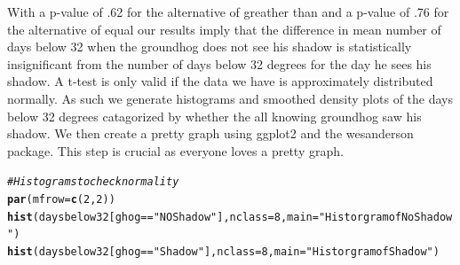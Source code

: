 \documentclass[12pt]{article}\usepackage[]{graphicx}\usepackage[]{color}
\makeatletter
\newcommand{\hlnum}[1]{\textcolor[rgb]{0.686,0.059,0.569}{#1}}%
\newcommand{\hlstr}[1]{\textcolor[rgb]{0.192,0.494,0.8}{#1}}%
\newcommand{\hlcom}[1]{\textcolor[rgb]{0.678,0.584,0.686}{\textit{#1}}}%
\newcommand{\hlopt}[1]{\textcolor[rgb]{0,0,0}{#1}}%
\newcommand{\hlstd}[1]{\textcolor[rgb]{0.345,0.345,0.345}{#1}}%
\newcommand{\hlkwc}[1]{\textcolor[rgb]{0.333,0.667,0.333}{#1}}%
\newcommand{\hlkwd}[1]{\textcolor[rgb]{0.737,0.353,0.396}{\textbf{#1}}}%
\newenvironment{kframe}{%
 \def\at@end@of@kframe{}%
 \ifinner\ifhmode%
  \def\at@end@of@kframe{\end{minipage}}%
  \begin{minipage}{\columnwidth}%
 \fi\fi%
 \def\FrameCommand##1{\hskip\@totalleftmargin \hskip-\fboxsep
 \colorbox{shadecolor}{##1}\hskip-\fboxsep
     \hskip-\linewidth \hskip-\@totalleftmargin \hskip\columnwidth}%
 \MakeFramed {\advance\hsize-\width
   \@totalleftmargin\z@ \linewidth\hsize
   \@setminipage}}%
 {\par\unskip\endMakeFramed%
 \at@end@of@kframe}
\newenvironment{knitrout}{}{} %
\makeatother
\begin{document}
With a p-value of .62 for the alternative of greather than and a p-value of .76 for the alternative of equal our results imply that the difference in mean number of days below 32 when the groundhog does not see his shadow is statistically insignificant from the number of days below 32 degrees for the day he sees his shadow. A t-test is only valid if the data we have is approximately distributed normally. As such we generate histograms and smoothed density plots of the days below 32 degrees catagorized by whether the all knowing groundhog saw his shadow. We then create a pretty graph using ggplot2 and the wesanderson package. This step is crucial as everyone loves a pretty graph.

\begin{knitrout}
\color{fgcolor}\begin{kframe}
\begin{alltt}
\hlcom{#Histograms to check normality}
\hlkwd{par}\hlstd{(}\hlkwc{mfrow}\hlstd{=}\hlkwd{c}\hlstd{(}\hlnum{2}\hlstd{,}\hlnum{2}\hlstd{))}
\hlkwd{hist}\hlstd{(daysbelow32[ghog}\hlopt{==}\hlstr{"NOShadow"}\hlstd{],}\hlkwc{nclass}\hlstd{=}\hlnum{8}\hlstd{,}\hlkwc{main}\hlstd{=}\hlstr{"Historgram of No Shadow"}\hlstd{)}
\hlkwd{hist}\hlstd{(daysbelow32[ghog}\hlopt{==}\hlstr{"Shadow"}\hlstd{],}\hlkwc{nclass}\hlstd{=}\hlnum{8}\hlstd{,}\hlkwc{main}\hlstd{=}\hlstr{"Historgram of Shadow"}\hlstd{)}


\end{alltt}
\end{kframe}
\end{knitrout}
\end{document}
